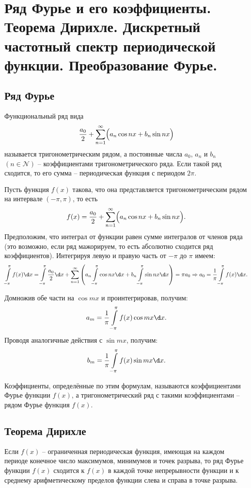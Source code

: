 \chapter{Ряд Фурье и его коэффициенты. Теорема Дирихле. Дискретный частотный
спектр периодической функции. Преобразование Фурье.}

\section{Ряд Фурье}
Функциональный ряд вида
\[
    \displaystyle \frac{a_0}{2} + \sum\limits_{n=1}^\infty
    \Bigl(a_n\cos nx + b_n\sin nx\Bigr)
\]
называется тригонометрическим рядом, а постоянные числа \( a_0 \), \( a_n \) и
\( b_n \) \( (n \in \mathcal{N}) \) -- коэффициентами тригонометрического ряда.
Если такой ряд сходится, то его сумма -- периодическая функция с периодом
\( 2\pi \).

Пусть функция \( f(x) \) такова, что она представляется тригонометрическим рядом
на интервале \( (-\pi, \pi) \), то есть
\[
    \displaystyle f(x) = \frac{a_0}{2} +
    \sum\limits_{n=1}^\infty \Bigl(a_n\cos nx + b_n\sin nx\Bigr).
\]
Предположим, что интеграл от функции равен сумме интегралов от членов ряда
(это возможно, если ряд мажорируем, то есть абсолютно сходится ряд
коэффициентов). Интегрируя левую и правую часть от \( -\pi \) до \( \pi \)
имеем:
\[
    \int\limits_{-\pi}^\pi f(x)\d x = \int\limits_{-\pi}^\pi \frac{a_0}{2}\d x +
    \sum\limits_{n=1}^\infty \left(a_n\int\limits_{-\pi}^\pi \cos nx\d x + b_n
    \int\limits_{-\pi}^\pi \sin nx\d x\right) = \pi a_0 \Rightarrow
    a_0 = \frac{1}{\pi}\int\limits_{-\pi}^\pi f(x) \d x.
\]

Домножив обе части на \( \cos mx \) и проинтегрировав, получим:
\[
    \ds a_m = \frac{1}{\pi} \int\limits_{-\pi}^\pi f(x)\cos mx\d x.
\]
Проводя аналогичные действия с \( \sin mx \), получим:
\[
    \ds b_m = \frac{1}{\pi} \int\limits_{-\pi}^\pi f(x)\sin mx \d x.
\]

Коэффициенты, определённые по этим формулам, называются коэффициентами Фурье
функции \( f(x) \), а тригонометрический ряд с такими коэффициентами -- рядом
Фурье функция \( f(x) \).

\section{Теорема Дирихле}
Если \( f(x) \) -- ограниченная периодическая функция, имеющая на каждом периоде
конечное число максимумов, минимумов и точек разрыва, то ряд Фурье функции
\( f(x) \) сходится к \( f(x) \) в каждой точке непрерывности функции и к
среднему арифметическому пределов функции слева и справа в точке разрыва.

